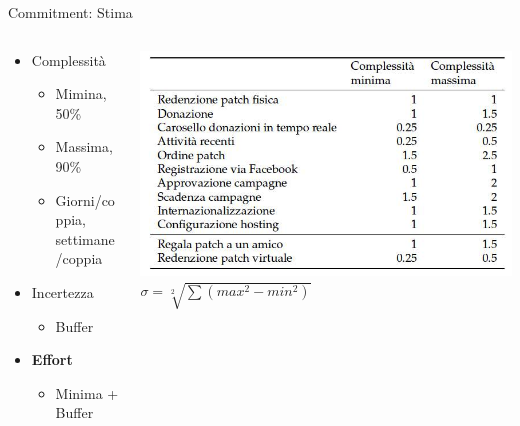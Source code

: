 \documentclass[compress, red, 14pt, pdf]{beamer}
\begin{document}
	\begin{frame}{Commitment: Stima}
		
		\begin{columns}[T]
		    \begin{column}{.5\textwidth}
		
				\begin{itemize}
					\item Complessità
					\begin{itemize}
						\item Mimina, 50\%
						\item Massima, 90\%
						\item Giorni/coppia, settimane/coppia
					\end{itemize}
					\item Incertezza
					\begin{itemize}
						\item Buffer
					\end{itemize}
				\end{itemize}

				\begin{itemize}
					\item \textbf{Effort}
					\begin{itemize}
						\item Minima + Buffer
					\end{itemize}
				\end{itemize}
		
		    \end{column}
		    \begin{column}{.5\textwidth}
				\hspace*{-0.6cm} \includegraphics[scale=0.25]{images/effort}
				\vspace*{0.5cm}
				\hspace*{-0.6cm} $ \sigma = \sqrt[2] { \sum \left ( max^{2} - min^{2} \right ) } $
		    \end{column}
		 \end{columns}
	
	\end{frame}
\end{document}
